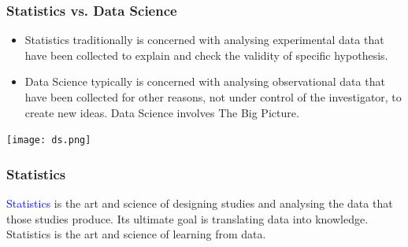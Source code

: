 \documentclass{beamer}
\begin{document}
\begin{frame}
\frametitle{Statistics vs. Data Science}
\begin{itemize}
\item Statistics traditionally is concerned with analysing experimental data that have been
collected to explain and check the validity of specific hypothesis.
\item Data Science typically is concerned with  analysing observational data that have been 
collected for other reasons, not under control of the investigator, to create new ideas. Data Science involves The Big Picture.
\end{itemize}
\begin{center}
\vspace{-.35cm}
\texttt{[image: ds.png]}
\end{center}
\end{frame}
\begin{frame}
\frametitle{Statistics}
\textcolor{blue}{Statistics} is the art and science of designing studies and analysing the data that those studies produce. 
Its ultimate goal is translating data into knowledge. Statistics is the art and science of learning from data.

\end{frame}
\end{document}
